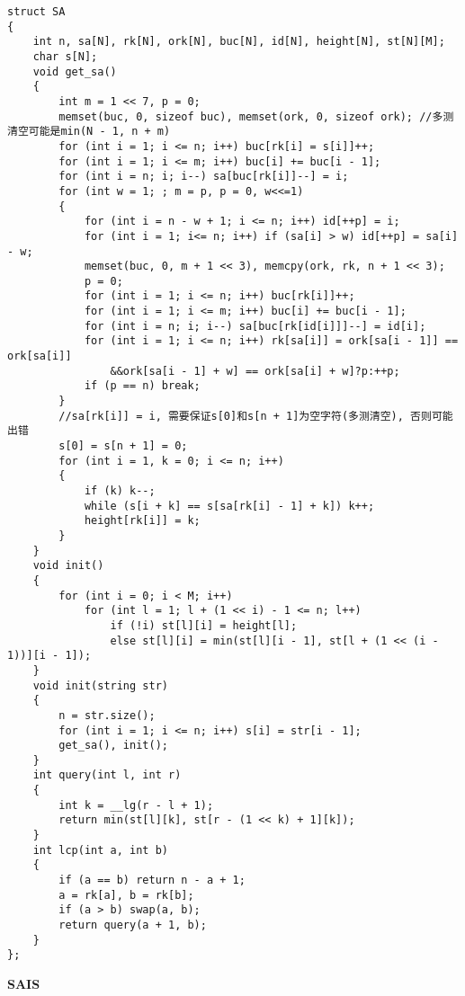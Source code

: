 \documentclass[a4paper, fontset=none]{ctexart}
\begin{document}
\begin{verbatim}
struct SA
{
    int n, sa[N], rk[N], ork[N], buc[N], id[N], height[N], st[N][M];
    char s[N];
    void get_sa()
    {
        int m = 1 << 7, p = 0;
        memset(buc, 0, sizeof buc), memset(ork, 0, sizeof ork); //多测清空可能是min(N - 1, n + m)
        for (int i = 1; i <= n; i++) buc[rk[i] = s[i]]++;
        for (int i = 1; i <= m; i++) buc[i] += buc[i - 1];
        for (int i = n; i; i--) sa[buc[rk[i]]--] = i;
        for (int w = 1; ; m = p, p = 0, w<<=1)
        {
            for (int i = n - w + 1; i <= n; i++) id[++p] = i;
            for (int i = 1; i<= n; i++) if (sa[i] > w) id[++p] = sa[i] - w;
            memset(buc, 0, m + 1 << 3), memcpy(ork, rk, n + 1 << 3);
            p = 0;
            for (int i = 1; i <= n; i++) buc[rk[i]]++;
            for (int i = 1; i <= m; i++) buc[i] += buc[i - 1];
            for (int i = n; i; i--) sa[buc[rk[id[i]]]--] = id[i];
            for (int i = 1; i <= n; i++) rk[sa[i]] = ork[sa[i - 1]] == ork[sa[i]]
                &&ork[sa[i - 1] + w] == ork[sa[i] + w]?p:++p;
            if (p == n) break;
        }
        //sa[rk[i]] = i, 需要保证s[0]和s[n + 1]为空字符(多测清空), 否则可能出错
        s[0] = s[n + 1] = 0;
        for (int i = 1, k = 0; i <= n; i++)
        {
            if (k) k--;
            while (s[i + k] == s[sa[rk[i] - 1] + k]) k++;
            height[rk[i]] = k;
        }
    }
    void init()
    {
        for (int i = 0; i < M; i++)
            for (int l = 1; l + (1 << i) - 1 <= n; l++)
                if (!i) st[l][i] = height[l];
                else st[l][i] = min(st[l][i - 1], st[l + (1 << (i - 1))][i - 1]);
    }
    void init(string str)
    {
        n = str.size();
        for (int i = 1; i <= n; i++) s[i] = str[i - 1];
        get_sa(), init();
    }
    int query(int l, int r)
    {
        int k = __lg(r - l + 1);
        return min(st[l][k], st[r - (1 << k) + 1][k]);
    }
    int lcp(int a, int b)
    {
        if (a == b) return n - a + 1;
        a = rk[a], b = rk[b];
        if (a > b) swap(a, b);
        return query(a + 1, b);
    }
};
\end{verbatim}

\textbf{SAIS}
\end{document}
